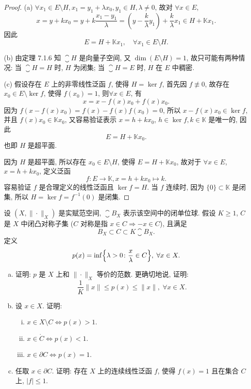\begin{proof}
    (a) $\forall x_1\in E\setminus H,x_1=y_1+\lambda x_0,y_1\in H,\lambda\neq0$, 故对 $\forall x\in E$,
    \[x=y+kx_0=y+k\frac{x_1-y_1}{\lambda}=\left(y-\frac{k}{\lambda}y_1\right)+\frac{k}{\lambda}x_1\in H+\mathbb{K}x_1.\]
    因此
    \[E=H+\mathbb{K}x_1,\quad\forall x_1\in E\setminus H.\]

    (b) 由定理 7.1.6 知 $\closure{H}$ 是向量子空间, 又 $\dim (E\setminus H)=1$, 故只可能有两种情况:
    当 $\closure{H}=H$ 时, $H$ 为闭集; 当 $\closure{H}=E$ 时, $H$ 在 $E$ 中稠密.

    (c) \sufficient
    假设存在 $E$ 上的非零线性泛函 $f$, 使得 $H=\ker f$, 首先因 $f\not\equiv 0$,
    故存在 $x_0\in E\setminus\ker f$, 使得 $f(x_0)=1$, 则$\forall x\in E$, 有
    \[x=x-f(x)x_0+f(x)x_0.\]
    因为 $f(x-f(x)x_0)=f(x)-f(x)f(x_0)=0$, 所以 $x-f(x)x_0\in\ker f$,
    并且 $f(x)x_0\in\mathbb{K}x_0$, 又容易验证表示 $x=h+kx_0$, $h\in\ker f,k\in\mathbb{K}$ 是唯一的, 因此
    \[E=H+\mathbb{K}x_0.\]
    也即 $H$ 是超平面.

    \necessary
    因为 $H$ 是超平面, 所以存在 $x_0\in E\setminus H$, 使得 $E=H+\mathbb{K}x_0$, 
    故对于 $\forall x\in E$, $x=h+kx_0$, 定义泛函
    \[f:E\to\mathbb{K},x=h+kx_0\mapsto k.\]
    容易验证 $f$ 是合理定义的线性泛函且 $\ker f=H$.
    当 $f$ 连续时, 因为 $\{0\}\subset\mathbb{K}$ 是闭集, 所以 $H=\ker f=f^{-1}(0)$ 是闭集.
\end{proof}



\begin{exercise}
  设 $(X,\|\cdot\|_X)$ 是实赋范空间, $\closure{B}_X$ 表示该空间中的闭单位球.
  假设 $K\geq 1$, $C$ 是 $X$ 中闭凸对称子集 ($C$ 对称是指 $x\in C\Rightarrow -x\in C$), 且满足
  \[B_X\subset C\subset K\closure{B}_X.\]
  定义
  \[p(x) = \inf\Bigl\{\lambda>0\colon\frac{x}{\lambda}\in C\Bigr\},\;\forall x\in X.\]
  \begin{enumerate}[(a)]
    \item 证明: $p$ 是 $X$ 上和 $\|\cdot\|_X$ 等价的范数. 更确切地说, 证明:
      \[\frac{1}{K}\|x\|\leq p(x)\leq\|x\|,\;\forall x\in X.\]
    \item 设 $x\in X$. 证明:
      \begin{enumerate}[(i)]
          \item $x\in X\setminus C\Longleftrightarrow p(x)>1$.
          \item $x\in\mathring{C}\Longleftrightarrow p(x)<1$.
          \item $x\in\partial C\Longleftrightarrow p(x)=1$.
      \end{enumerate}
    \item 任取 $x\in\partial C$. 证明: 存在 $X$ 上的连续线性泛函 $f$, 使得 $f(x)=1$ 且在集合 $C$ 上, $|f|\leq 1$.
    \end{enumerate}
\end{exercise}

